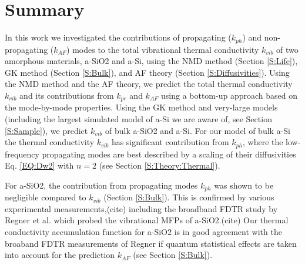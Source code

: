 \documentclass[aps,prb,onecolumn,preprint,superscriptaddress,footinbib,amsmath,amssymb,floatfix]{revtex4}
\begin{document}
\section{\label{S:Lifetimes}Summary}

In this work we investigated the contributions of propagating ($k_{ph}$) 
and non-propagating ($k_{AF}$) modes to the total vibrational 
thermal conductivity $k_{vib}$ of two amorphous materials, 
a-SiO2 and a-Si, using the NMD method (Section \ref{S:Life}), 
GK method (Section \ref{S:Bulk}), 
and AF theory (Section \ref{S:Diffusivities}). 
Using the NMD method and the AF theory, 
we predict the total thermal conductivity $k_{vib}$ and its 
contributions from $k_{pr}$ and $k_{AF}$ using a bottom-up approach 
based on the mode-by-mode properties. Using the GK method and very-large 
models (including the largest simulated model of a-Si we are aware of, 
see Section \ref{S:Sample}), 
we predict $k_{vib}$ of bulk a-SiO2 and a-Si. For our model of bulk a-Si 
the thermal conductivity $k_{vib}$ has  
significant contribution from $k_{ph}$, where the low-frequency 
propagating modes are best described by a scaling of their 
diffusivities Eq. \eqref{EQ:Dw2} with $n=2$ (see Section \ref{S:Theory:Thermal}).  

For a-SiO2, the contribution from propagating modes $k_{ph}$ was shown to 
be negligible compared to $k_{vib}$ (Section \ref{S:Bulk}). 
This is confirmed by various 
experimental measurements,(cite) including the broadband FDTR study 
by Regner et al. which 
probed the vibrational MFPs of a-SiO2.(cite) Our thermal conductivity 
accumulation function for a-SiO2 is in good agreement with the 
broaband FDTR measurements of Regner if quantum statistical effects are 
taken into account for the prediction $k_{AF}$ 
(see Section \ref{S:Bulk}). 
\end{document}
